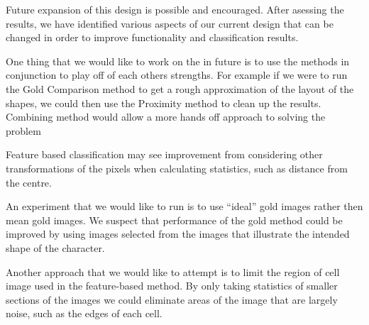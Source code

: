 Future expansion of this design is possible and encouraged. After asessing the results, we have identified various aspects of our current design that can be changed in order to improve functionality and classification results.

One thing that we would like to work on the in future is to use the methods in
conjunction to play off of each others strengths. For example if we were to run
the Gold Comparison method to get a rough approximation of the layout of the
shapes, we could then use the Proximity method to clean up the results.
Combining method would allow a more hands off approach to solving the problem

Feature based classification may see improvement from considering other
transformations of the pixels when calculating statistics, such as distance
from the centre.

An experiment that we would like to run is to use ``ideal'' gold images rather
then mean gold images. We suspect that performance of the gold method could be
improved by using images selected from the images that illustrate the intended
shape of the character.

Another approach that we would like to attempt is to limit the region of cell
image used in the feature-based method. By only taking statistics of smaller
sections of the images we could eliminate areas of the image that are largely
noise, such as the edges of each cell.

